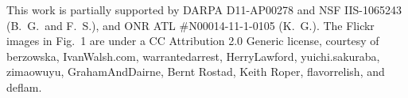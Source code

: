 \documentclass[graybox]{svmult}
\begin{document}




%





\begin{acknowledgement}
This work is partially supported by DARPA D11-AP00278 and NSF IIS-1065243 (B.~G.\ and F.~S.), and ONR ATL \#N00014-11-1-0105 (K.~G.). The Flickr images in Fig.~1 are under a CC Attribution 2.0 Generic license, courtesy of berzowska, IvanWalsh.com, warrantedarrest, HerryLawford, yuichi.sakuraba, zimaowuyu, GrahamAndDairne, Bernt Rostad, Keith Roper, flavorrelish, and deflam.
\end{acknowledgement}







\end{document}
